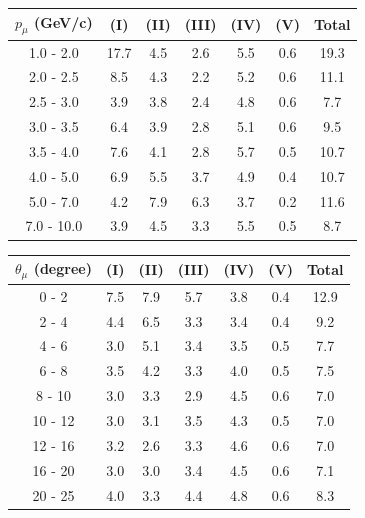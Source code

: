 \documentclass[aps, prd, reprint,showpacs,  preprintnumbers,amsmath,amssymb,superscriptaddress, nofootinbib]{revtex4-1}
\makeatletter
\renewenvironment{table}
  {\def\@captype{table}}
  {}
\makeatother
\begin{document}
\vspace{0.5cm}

\begin{table}
\centering
\begin{tabular}{ccccccc}
\hline
$p_{\mu}$ (GeV/c) & (I) & (II) & (III) & (IV) & (V) & Total \\
\hline 
     1.0 - 2.0 & 17.7 &  4.5 &  2.6 &  5.5 &  0.6 & 19.3 \\
     2.0 - 2.5 &  8.5 &  4.3 &  2.2 &  5.2 &  0.6 & 11.1 \\
     2.5 - 3.0 &  3.9 &  3.8 &  2.4 &  4.8 &  0.6 &  7.7 \\
     3.0 - 3.5 &  6.4 &  3.9 &  2.8 &  5.1 &  0.6 &  9.5 \\
     3.5 - 4.0 &  7.6 &  4.1 &  2.8 &  5.7 &  0.5 & 10.7 \\
     4.0 - 5.0 &  6.9 &  5.5 &  3.7 &  4.9 &  0.4 & 10.7 \\
     5.0 - 7.0 &  4.2 &  7.9 &  6.3 &  3.7 &  0.2 & 11.6 \\
    7.0 - 10.0 &  3.9 &  4.5 &  3.3 &  5.5 &  0.5 &  8.7 \\
\hline\hline
\end{tabular}
\caption{Fractional systematic uncertainties (in percent) for $d\sigma/dp_\mu$.}
\label{tb:syst-muon-momentum}
\end{table}

\vspace{1cm}

\begin{table}
\centering
\begin{tabular}{ccccccc}
\hline
$\theta_{\mu}$ (degree) & (I) & (II) & (III) & (IV) & (V) & Total \\
\hline
        0 -  2 &  7.5 &  7.9 &  5.7 &  3.8 &  0.4 & 12.9 \\
        2 -  4 &  4.4 &  6.5 &  3.3 &  3.4 &  0.4 &  9.2 \\
        4 -  6 &  3.0 &  5.1 &  3.4 &  3.5 &  0.5 &  7.7 \\
        6 -  8 &  3.5 &  4.2 &  3.3 &  4.0 &  0.5 &  7.5 \\
        8 - 10 &  3.0 &  3.3 &  2.9 &  4.5 &  0.6 &  7.0 \\
       10 - 12 &  3.0 &  3.1 &  3.5 &  4.3 &  0.5 &  7.0 \\
       12 - 16 &  3.2 &  2.6 &  3.3 &  4.6 &  0.6 &  7.0 \\
       16 - 20 &  3.0 &  3.0 &  3.4 &  4.5 &  0.6 &  7.1 \\
       20 - 25 &  4.0 &  3.3 &  4.4 &  4.8 &  0.6 &  8.3 \\
\hline\hline
\end{tabular}
\caption{Fractional systematic uncertainties (in percent) for $d\sigma/d\theta_\mu$.}
\label{tb:syst-muon-angler}
\end{table}
\end{document}
